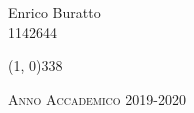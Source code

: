 \begin{titlepage}
\begin{center}
\begin{vplace}
\vspace{80pt}

\begin{large}
Enrico Buratto \\
1142644
\end{large}

\end{vplace}

\line(1, 0){338} \\

\vspace{10pt}

\begin{normalsize}
\textsc{Anno Accademico 2019-2020}
\end{normalsize}

\end{center}
\end{titlepage}
